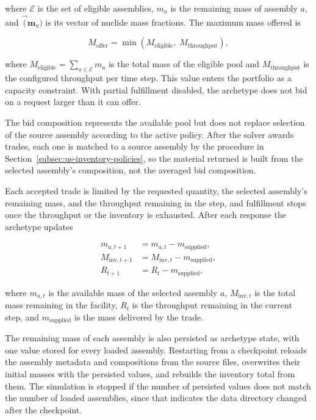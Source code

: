 where \(\mathcal{E}\) is the set of eligible assemblies, \(m_a\) is the remaining mass of
assembly \(a\), and \(\vec(\mathbf{m}_a)\) is its vector of nuclide mass fractions. The
maximum mass offered is

\begin{equation}
    M_{\mathrm{offer}}
    =
    \min\!\left(
        M_{\mathrm{eligible}},\;
        M_{\mathrm{throughput}}
    \right),
    \label{eq:usinv-offer-capacity}
\end{equation}

where \(M_{\mathrm{eligible}} = \sum_{a \in \mathcal{E}} m_a\) is the total mass of
the eligible pool and \(M_{\mathrm{throughput}}\) is the configured
throughput per time step. This value enters the portfolio as a capacity
constraint. With partial fulfillment disabled, the archetype does not bid on a
request larger than it can offer.

The bid composition represents the available pool but does not replace
selection of the source assembly according to the active policy. After the
solver awards trades,
each one is matched to a source assembly by the procedure in
Section~\ref{subsec:us-inventory-policies}, so the material returned is built from
the selected assembly's composition, not the averaged bid composition.

Each accepted trade is limited by the requested quantity, the selected assembly's
remaining mass, and the throughput remaining in the step, and fulfillment stops
once the throughput or the inventory is exhausted. After each response the
archetype updates

\begin{align}
    m_{a,t+1}
    &= m_{a,t} - m_{\mathrm{supplied}},
    \label{eq:usinv-bin-update} \\
    M_{\mathrm{inv},t+1}
    &= M_{\mathrm{inv},t} - m_{\mathrm{supplied}},
    \label{eq:usinv-inv-update} \\
    R_{t+1}
    &= R_{t} - m_{\mathrm{supplied}},
    \label{eq:usinv-throughput-update}
\end{align}

where \(m_{a,t}\) is the available mass of the selected assembly \(a\),
\(M_{\mathrm{inv},t}\) is the total mass remaining in the facility, \(R_t\) is the
throughput remaining in the current step, and \(m_{\mathrm{supplied}}\) is the mass
delivered by the trade.

The remaining mass of each assembly is also persisted as archetype state, with
one value stored for every loaded assembly. Restarting from a checkpoint
reloads the assembly metadata
and compositions from the source files, overwrites their initial masses with the
persisted values, and rebuilds the inventory total from them. The simulation is
stopped if the number of persisted values does not match the number of loaded
assemblies, since that indicates the data directory changed after the checkpoint.

